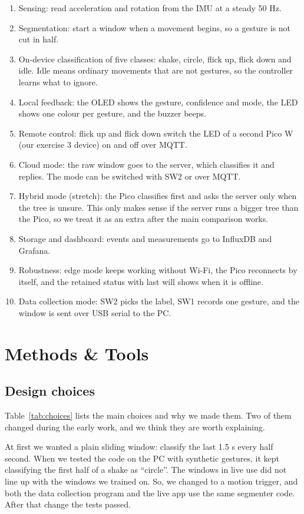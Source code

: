 \documentclass{article}
\begin{document}
\begin{enumerate}
\item Sensing: read acceleration and rotation from the IMU at a steady 50 Hz.
\item Segmentation: start a window when a movement begins, so a gesture is not cut in half.
\item On-device classification of five classes: shake, circle, flick up, flick down and idle. Idle means ordinary movements that are not gestures, so the controller learns what to ignore.
\item Local feedback: the OLED shows the gesture, confidence and mode, the LED shows one colour per gesture, and the buzzer beeps.
\item Remote control: flick up and flick down switch the LED of a second Pico W (our exercise 3 device) on and off over MQTT.
\item Cloud mode: the raw window goes to the server, which classifies it and replies. The mode can be switched with SW2 or over MQTT.
\item Hybrid mode (stretch): the Pico classifies first and asks the server only when the tree is unsure. This only makes sense if the server runs a bigger tree than the Pico, so we treat it as an extra after the main comparison works.
\item Storage and dashboard: events and measurements go to InfluxDB and Grafana.
\item Robustness: edge mode keeps working without Wi-Fi, the Pico reconnects by itself, and the retained status with last will shows when it is offline.
\item Data collection mode: SW2 picks the label, SW1 records one gesture, and the window is sent over USB serial to the PC.
\end{enumerate}

\section{Methods \& Tools}

\subsection{Design choices}

Table~\ref{tab:choices} lists the main choices and why we made them. Two of them changed during the early work, and we think they are worth explaining.

At first we wanted a plain sliding window: classify the last 1.5 s every half second. When we tested the code on the PC with synthetic gestures, it kept classifying the first half of a shake as ``circle''. The windows in live use did not line up with the windows we trained on. So, we changed to a motion trigger, and both the data collection program and the live app use the same segmenter code. After that change the tests passed.
\end{document}
